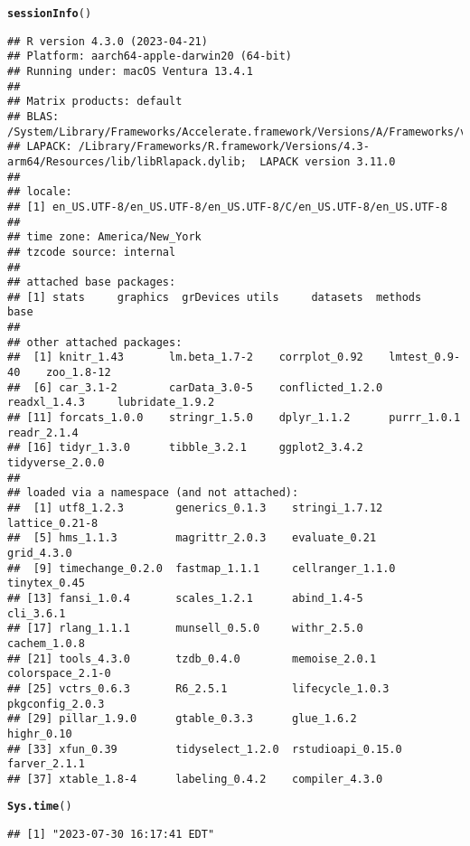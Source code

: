 \documentclass{article}\usepackage[]{graphicx}\usepackage[]{xcolor}
\makeatletter
\newcommand{\hlstd}[1]{\textcolor[rgb]{0.345,0.345,0.345}{#1}}%
\newcommand{\hlkwd}[1]{\textcolor[rgb]{0.737,0.353,0.396}{\textbf{#1}}}%
\newenvironment{kframe}{%
 \def\at@end@of@kframe{}%
 \ifinner\ifhmode%
  \def\at@end@of@kframe{\end{minipage}}%
  \begin{minipage}{\columnwidth}%
 \fi\fi%
 \def\FrameCommand##1{\hskip\@totalleftmargin \hskip-\fboxsep
 \colorbox{shadecolor}{##1}\hskip-\fboxsep
     \hskip-\linewidth \hskip-\@totalleftmargin \hskip\columnwidth}%
 \MakeFramed {\advance\hsize-\width
   \@totalleftmargin\z@ \linewidth\hsize
   \@setminipage}}%
 {\par\unskip\endMakeFramed%
 \at@end@of@kframe}
\newenvironment{knitrout}{}{} %
\makeatother
\begin{document}
\begin{knitrout}
\color{fgcolor}\begin{kframe}
\begin{alltt}
\hlkwd{sessionInfo}\hlstd{()}
\end{alltt}
\begin{verbatim}
## R version 4.3.0 (2023-04-21)
## Platform: aarch64-apple-darwin20 (64-bit)
## Running under: macOS Ventura 13.4.1
## 
## Matrix products: default
## BLAS:   /System/Library/Frameworks/Accelerate.framework/Versions/A/Frameworks/vecLib.framework/Versions/A/libBLAS.dylib 
## LAPACK: /Library/Frameworks/R.framework/Versions/4.3-arm64/Resources/lib/libRlapack.dylib;  LAPACK version 3.11.0
## 
## locale:
## [1] en_US.UTF-8/en_US.UTF-8/en_US.UTF-8/C/en_US.UTF-8/en_US.UTF-8
## 
## time zone: America/New_York
## tzcode source: internal
## 
## attached base packages:
## [1] stats     graphics  grDevices utils     datasets  methods   base     
## 
## other attached packages:
##  [1] knitr_1.43       lm.beta_1.7-2    corrplot_0.92    lmtest_0.9-40    zoo_1.8-12      
##  [6] car_3.1-2        carData_3.0-5    conflicted_1.2.0 readxl_1.4.3     lubridate_1.9.2 
## [11] forcats_1.0.0    stringr_1.5.0    dplyr_1.1.2      purrr_1.0.1      readr_2.1.4     
## [16] tidyr_1.3.0      tibble_3.2.1     ggplot2_3.4.2    tidyverse_2.0.0 
## 
## loaded via a namespace (and not attached):
##  [1] utf8_1.2.3        generics_0.1.3    stringi_1.7.12    lattice_0.21-8   
##  [5] hms_1.1.3         magrittr_2.0.3    evaluate_0.21     grid_4.3.0       
##  [9] timechange_0.2.0  fastmap_1.1.1     cellranger_1.1.0  tinytex_0.45     
## [13] fansi_1.0.4       scales_1.2.1      abind_1.4-5       cli_3.6.1        
## [17] rlang_1.1.1       munsell_0.5.0     withr_2.5.0       cachem_1.0.8     
## [21] tools_4.3.0       tzdb_0.4.0        memoise_2.0.1     colorspace_2.1-0 
## [25] vctrs_0.6.3       R6_2.5.1          lifecycle_1.0.3   pkgconfig_2.0.3  
## [29] pillar_1.9.0      gtable_0.3.3      glue_1.6.2        highr_0.10       
## [33] xfun_0.39         tidyselect_1.2.0  rstudioapi_0.15.0 farver_2.1.1     
## [37] xtable_1.8-4      labeling_0.4.2    compiler_4.3.0
\end{verbatim}
\begin{alltt}
\hlkwd{Sys.time}\hlstd{()}
\end{alltt}
\begin{verbatim}
## [1] "2023-07-30 16:17:41 EDT"
\end{verbatim}
\end{kframe}
\end{knitrout}
\end{document}

